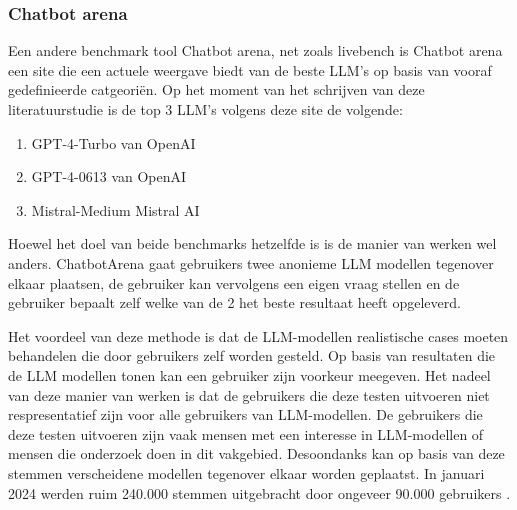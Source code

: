         \subsubsection{Chatbot arena} 
        
        Een andere benchmark tool Chatbot arena, net zoals livebench is Chatbot arena een site die een actuele weergave biedt van de beste LLM's op basis van vooraf gedefinieerde catgeoriën. Op het moment van het schrijven van deze literatuurstudie is de top 3 LLM's volgens deze site de volgende:
        
        \begin{enumerate}
            \item GPT-4-Turbo van OpenAI
            \item GPT-4-0613 van OpenAI
            \item Mistral-Medium Mistral AI
        \end{enumerate}
        
        Hoewel het doel van beide benchmarks hetzelfde is is de manier van werken wel anders. ChatbotArena gaat gebruikers twee anonieme LLM modellen tegenover elkaar plaatsen, de gebruiker kan vervolgens een eigen vraag stellen en de gebruiker bepaalt zelf welke van de 2 het beste resultaat heeft opgeleverd.
        
        Het voordeel van deze methode is dat de LLM-modellen realistische cases moeten behandelen die door gebruikers zelf worden gesteld. Op basis van resultaten die de LLM modellen tonen kan een gebruiker zijn voorkeur meegeven. Het nadeel van deze manier van werken is dat de gebruikers die deze testen uitvoeren niet respresentatief zijn voor alle gebruikers van LLM-modellen. De gebruikers die deze testen uitvoeren zijn vaak mensen met een interesse in LLM-modellen of mensen die onderzoek doen in dit vakgebied. Desoondanks kan op basis van deze stemmen verscheidene modellen tegenover elkaar worden geplaatst. In januari 2024 werden ruim 240.000 stemmen uitgebracht door ongeveer 90.000 gebruikers \autocite{Chiang2024}. 
        
        
